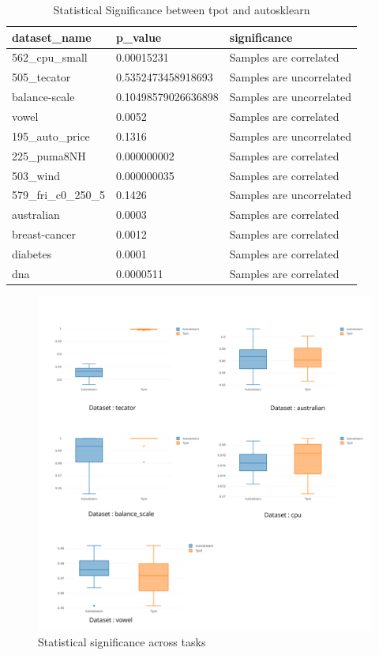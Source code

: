 \begin{table}[]
\centering
\begin{tabular}{|l|l|l|}
\hline
dataset\_name        & p\_value               & significance       \\ \hline
562\_cpu\_small      & 0.00015231             & Samples are correlated   \\ \hline
505\_tecator         & 0.5352473458918693     & Samples are uncorrelated \\ \hline
balance-scale        & 0.10498579026636898    & Samples are uncorrelated \\ \hline
vowel                & 0.0052                 & Samples are correlated   \\ \hline
195\_auto\_price     & 0.1316                 & Samples are uncorrelated \\ \hline
225\_puma8NH         & 0.000000002            & Samples are correlated   \\ \hline
503\_wind            & 0.000000035            & Samples are correlated   \\ \hline
579\_fri\_c0\_250\_5 & 0.1426                 & Samples are uncorrelated \\ \hline
australian           & 0.0003                 & Samples are correlated   \\ \hline
breast-cancer        & 0.0012                 & Samples are correlated   \\ \hline
diabetes             & 0.0001                 & Samples are correlated   \\ \hline
dna                  & 0.0000511              & Samples are correlated   \\ \hline
\end{tabular}
\caption{Statistical Significance between tpot and autosklearn}
\label{tbl:significance}
\end{table}

\begin{figure}[!h]
    	\centering
    	\includegraphics[width=0.84\linewidth]{thesis_template/images/significance.png}
    	\caption{Statistical significance across tasks}
    	\label{fig:significance}
        \end{figure}
        
